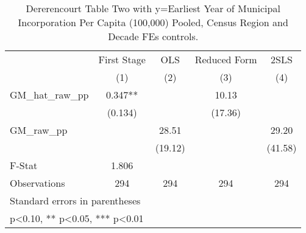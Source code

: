 \begin{table}[htbp]\centering
\def\sym#1{\ifmmode^{#1}\else\(^{#1}\)\fi}
\caption{Dererencourt Table Two with y=Earliest Year of Municipal Incorporation Per Capita (100,000) Pooled, Census Region and Decade FEs controls.}
\begin{tabular}{l*{4}{c}}
\toprule
                    & First Stage   &         OLS   &Reduced Form   &        2SLS   \\
                    &\multicolumn{1}{c}{(1)}   &\multicolumn{1}{c}{(2)}   &\multicolumn{1}{c}{(3)}   &\multicolumn{1}{c}{(4)}   \\
\midrule
GM\_hat\_raw\_pp       &       0.347** &               &       10.13   &               \\
                    &     (0.134)   &               &     (17.36)   &               \\
\addlinespace
GM\_raw\_pp           &               &       28.51   &               &       29.20   \\
                    &               &     (19.12)   &               &     (41.58)   \\
\midrule
F-Stat              &       1.806   &               &               &               \\
Observations        &         294   &         294   &         294   &         294   \\
\bottomrule
\multicolumn{5}{l}{\footnotesize Standard errors in parentheses}\\
\multicolumn{5}{l}{\footnotesize * p<0.10, ** p<0.05, *** p<0.01}\\
\end{tabular}
\end{table}
